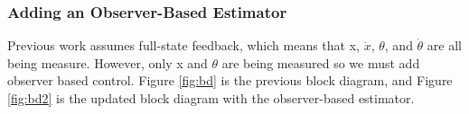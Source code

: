 \documentclass{article}
\begin{document}
 \subsubsection{Adding an Observer-Based Estimator}
 Previous work assumes full-state feedback, which means that x, $\dot{x}$, $\theta$, and $\dot{\theta}$ are all being measure. However, only x and $\theta$ are being measured so we must add observer based control. Figure \ref{fig:bd} is the previous block diagram, and Figure \ref{fig:bd2} is the updated block diagram with the observer-based estimator.

\begin{figure}
\begin{minipage}[c]{0.45\textwidth}
\centering
{}
\end{minipage}
\begin{minipage}[c]{0.45\textwidth}
\end{minipage}
\end{figure}
\end{document}
